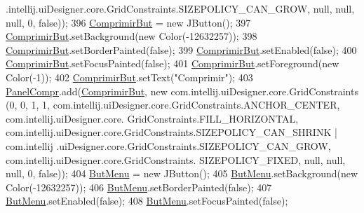 \begin{DoxyCode}
      .intellij.uiDesigner.core.GridConstraints.SIZEPOLICY\_CAN\_GROW, null, null, null, 0, \textcolor{keyword}{false}));
396         \hyperlink{classpresentacion_1_1form_1_1mainForm_a8a68ad38dda26d35d37dccec4fa9338d}{ComprimirBut} = \textcolor{keyword}{new} JButton();
397         \hyperlink{classpresentacion_1_1form_1_1mainForm_a8a68ad38dda26d35d37dccec4fa9338d}{ComprimirBut}.setBackground(\textcolor{keyword}{new} Color(-12632257));
398         \hyperlink{classpresentacion_1_1form_1_1mainForm_a8a68ad38dda26d35d37dccec4fa9338d}{ComprimirBut}.setBorderPainted(\textcolor{keyword}{false});
399         \hyperlink{classpresentacion_1_1form_1_1mainForm_a8a68ad38dda26d35d37dccec4fa9338d}{ComprimirBut}.setEnabled(\textcolor{keyword}{false});
400         \hyperlink{classpresentacion_1_1form_1_1mainForm_a8a68ad38dda26d35d37dccec4fa9338d}{ComprimirBut}.setFocusPainted(\textcolor{keyword}{false});
401         \hyperlink{classpresentacion_1_1form_1_1mainForm_a8a68ad38dda26d35d37dccec4fa9338d}{ComprimirBut}.setForeground(\textcolor{keyword}{new} Color(-1));
402         \hyperlink{classpresentacion_1_1form_1_1mainForm_a8a68ad38dda26d35d37dccec4fa9338d}{ComprimirBut}.setText(\textcolor{stringliteral}{"Comprimir"});
403         \hyperlink{classpresentacion_1_1form_1_1mainForm_a2d0f3d20d2a80c16321aaccbc273279d}{PanelCompr}.add(\hyperlink{classpresentacion_1_1form_1_1mainForm_a8a68ad38dda26d35d37dccec4fa9338d}{ComprimirBut}, \textcolor{keyword}{new} com.intellij.uiDesigner.core.GridConstraints
      (0, 0, 1, 1, com.intellij.uiDesigner.core.GridConstraints.ANCHOR\_CENTER, com.intellij.uiDesigner.core.
      GridConstraints.FILL\_HORIZONTAL, com.intellij.uiDesigner.core.GridConstraints.SIZEPOLICY\_CAN\_SHRINK | com.intellij
      .uiDesigner.core.GridConstraints.SIZEPOLICY\_CAN\_GROW, com.intellij.uiDesigner.core.GridConstraints.
      SIZEPOLICY\_FIXED, null, null, null, 0, \textcolor{keyword}{false}));
404         \hyperlink{classpresentacion_1_1form_1_1mainForm_aef69e0291d6680e935cf1161971b3b29}{ButMenu} = \textcolor{keyword}{new} JButton();
405         \hyperlink{classpresentacion_1_1form_1_1mainForm_aef69e0291d6680e935cf1161971b3b29}{ButMenu}.setBackground(\textcolor{keyword}{new} Color(-12632257));
406         \hyperlink{classpresentacion_1_1form_1_1mainForm_aef69e0291d6680e935cf1161971b3b29}{ButMenu}.setBorderPainted(\textcolor{keyword}{false});
407         \hyperlink{classpresentacion_1_1form_1_1mainForm_aef69e0291d6680e935cf1161971b3b29}{ButMenu}.setEnabled(\textcolor{keyword}{false});
408         \hyperlink{classpresentacion_1_1form_1_1mainForm_aef69e0291d6680e935cf1161971b3b29}{ButMenu}.setFocusPainted(\textcolor{keyword}{false});

\end{DoxyCode}
